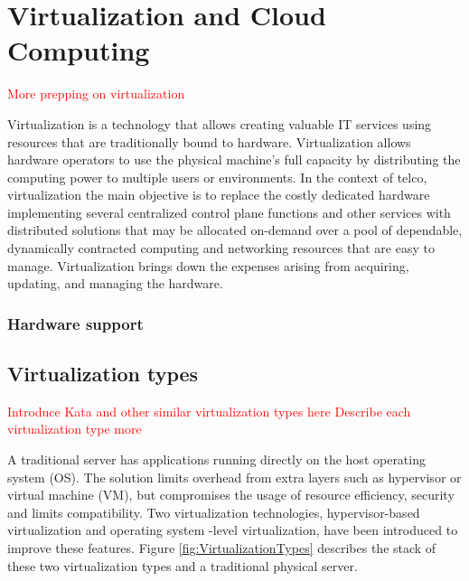 \chapter{Virtualization and Cloud Computing}
\label{chapter:cloudcomputing}




\textcolor{red}{More prepping on virtualization}

Virtualization is a technology that allows creating valuable IT services using resources that are traditionally bound to hardware. Virtualization allows hardware operators to use the physical machine's full capacity by distributing the computing power to multiple users or environments. \cite{RedHat} In the context of telco, virtualization the main objective is to replace the costly dedicated hardware implementing several centralized control plane functions and other services with distributed solutions that may be allocated on-demand over a pool of dependable, dynamically contracted computing and networking resources that are easy to manage. \cite{Bosch2011} Virtualization brings down the expenses arising from acquiring, updating, and managing the hardware.

\subsection{Hardware support}

\section{Virtualization types}
\textcolor{red}{Introduce Kata and other similar virtualization types here}
\textcolor{red}{Describe each virtualization type more}

A traditional server has applications running directly on the host operating system (OS). The solution limits overhead from extra layers such as hypervisor or virtual machine (VM), but compromises the usage of resource efficiency, security and limits compatibility. Two virtualization technologies, hypervisor-based virtualization and operating system -level virtualization, have been introduced to improve these features. Figure \ref{fig:VirtualizationTypes} describes the stack of these two virtualization types and a traditional physical server.


